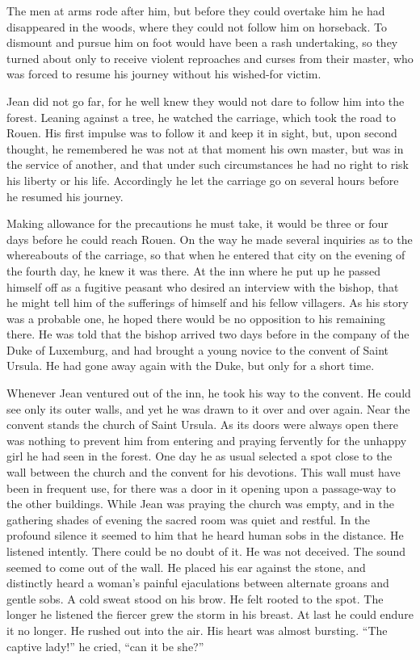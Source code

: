 The men at arms rode after him, but before they could overtake him he
had disappeared in the woods, where they could not follow him on
horseback. To dismount and pursue him on foot would have been a rash
undertaking, so they turned about only to receive violent reproaches and
curses from their master, who was forced to resume his journey without
his wished-for victim.

Jean did not go far, for he well knew they would not dare to follow him
into the forest. Leaning against a tree, he watched the carriage, which
took the road to Rouen. His first impulse was to follow it and keep it
in sight, but, upon second thought, he remembered he was not at that
moment his own master, but was in the service of another, and that under
such circumstances he had no right to risk his liberty or his life.
Accordingly he let the carriage go on several hours before he resumed
his journey.

Making allowance for the precautions he must take, it would be three or
four days before he could reach Rouen. On the way he made several
inquiries as to the whereabouts of the carriage, so that when he entered
that city on the evening of the fourth day, he knew it was there. At the
inn where he put up he passed himself off as a fugitive peasant who
desired an interview with the bishop, that he might tell him of the
sufferings of himself and his fellow villagers. As his story was a
probable one, he hoped there would be no opposition to his remaining
there. He was told that the bishop arrived two days before in the
company of the Duke of Luxemburg, and had brought a young novice to the
convent of Saint Ursula. He had gone away again with the Duke, but only
for a short time.

Whenever Jean ventured out of the inn, he took his way to the convent.
He could see only its outer walls, and yet he was drawn to it over and
over again. Near the convent stands the church of Saint Ursula. As its
doors were always open there was nothing to prevent him from entering
and praying fervently for the unhappy girl he had seen in the forest.
One day he as usual selected a spot close to the wall between the church
and the convent for his devotions. This wall must have been in frequent
use, for there was a door in it opening upon a passage-way to the other
buildings. While Jean was praying the church was empty, and in the
gathering shades of evening the sacred room was quiet and restful. In
the profound silence it seemed to him that he heard human sobs in the
distance. He listened intently. There could be no doubt of it. He was
not deceived. The sound seemed to come out of the wall. He placed his
ear against the stone, and distinctly heard a woman's painful
ejaculations between alternate groans and gentle sobs. A cold sweat
stood on his brow. He felt rooted to the spot. The longer he listened
the fiercer grew the storm in his breast. At last he could endure it no
longer. He rushed out into the air. His heart was almost bursting. ``The
captive lady!'' he cried, ``can it be she?''

